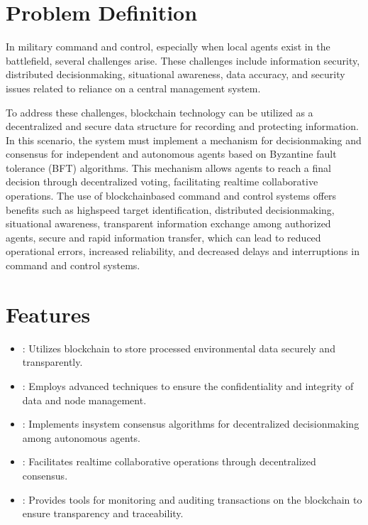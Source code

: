 \documentclass[letterpaper,10pt,english]{sphinxmanual}
\begin{document}
\section{Problem Definition}
\label{\detokenize{overview:problem-definition}}
\sphinxAtStartPar
In military command and control, especially when local agents exist in the battlefield, several challenges arise. These challenges include information security, distributed decision\sphinxhyphen{}making, situational awareness, data accuracy, and security issues related to reliance on a central management system.

\sphinxAtStartPar
To address these challenges, blockchain technology can be utilized as a decentralized and secure data structure for recording and protecting information. In this scenario, the system must implement a mechanism for decision\sphinxhyphen{}making and consensus for independent and autonomous agents based on Byzantine fault tolerance (BFT) algorithms. This mechanism allows agents to reach a final decision through decentralized voting, facilitating real\sphinxhyphen{}time collaborative operations. The use of blockchain\sphinxhyphen{}based command and control systems offers benefits such as high\sphinxhyphen{}speed target identification, distributed decision\sphinxhyphen{}making, situational awareness, transparent information exchange among authorized agents, secure and rapid information transfer, which can lead to reduced operational errors, increased reliability, and decreased delays and interruptions in command and control systems.


\section{Features}
\label{\detokenize{overview:features}}\begin{itemize}
\item {} 
\sphinxAtStartPar
{}: Utilizes blockchain to store processed environmental data securely and transparently.

\item {} 
\sphinxAtStartPar
{}: Employs advanced techniques to ensure the confidentiality and integrity of data and node management.

\item {} 
\sphinxAtStartPar
{}: Implements in\sphinxhyphen{}system consensus algorithms for decentralized decision\sphinxhyphen{}making among autonomous agents.

\item {} 
\sphinxAtStartPar
{}: Facilitates real\sphinxhyphen{}time collaborative operations through decentralized consensus.

\item {} 
\sphinxAtStartPar
{}: Provides tools for monitoring and auditing transactions on the blockchain to ensure transparency and traceability.

\end{itemize}
\end{document}
